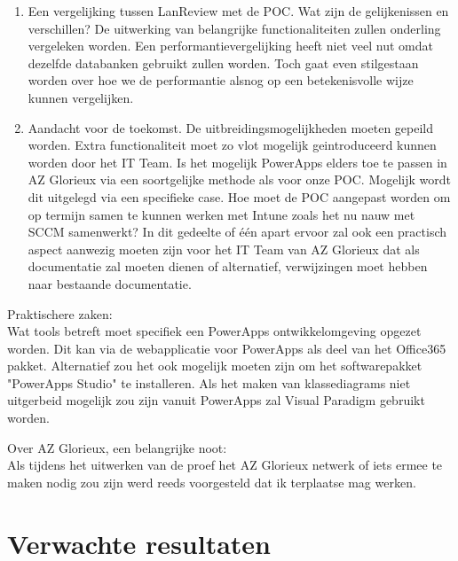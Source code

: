 \begin{enumerate}
    \item Een vergelijking tussen LanReview met de POC. Wat zijn de gelijkenissen en verschillen? De uitwerking van belangrijke functionaliteiten zullen onderling vergeleken worden. Een performantievergelijking heeft niet veel nut omdat dezelfde databanken gebruikt zullen worden. Toch gaat even stilgestaan worden over hoe we de performantie alsnog op een betekenisvolle wijze kunnen vergelijken.
    \item Aandacht voor de toekomst. De uitbreidingsmogelijkheden moeten gepeild worden. Extra functionaliteit moet zo vlot mogelijk geintroduceerd kunnen worden door het IT Team. Is het mogelijk PowerApps elders toe te passen in AZ Glorieux via een soortgelijke methode als voor onze POC. Mogelijk wordt dit uitgelegd via een specifieke case. Hoe moet de POC aangepast worden om op termijn samen te kunnen werken met Intune zoals het nu nauw met SCCM samenwerkt? In dit gedeelte of één apart ervoor zal ook een practisch aspect aanwezig moeten zijn voor het IT Team van AZ Glorieux dat als documentatie zal moeten dienen of alternatief, verwijzingen moet hebben naar bestaande documentatie.
\end{enumerate}


\vspace{5mm}

Praktischere zaken:\\
Wat tools betreft moet specifiek een PowerApps ontwikkelomgeving opgezet worden. Dit kan via de webapplicatie voor PowerApps als deel van het Office365 pakket. Alternatief zou het ook mogelijk moeten zijn om het softwarepakket "PowerApps Studio" te installeren. Als het maken van klassediagrams niet uitgerbeid mogelijk zou zijn vanuit PowerApps zal Visual Paradigm gebruikt worden. 

Over AZ Glorieux, een belangrijke noot:\\
Als tijdens het uitwerken van de proef het AZ Glorieux netwerk of iets ermee te maken nodig zou zijn werd reeds voorgesteld dat ik terplaatse mag werken.

\section{Verwachte resultaten}
\label{sec:verwachte_resultaten}

